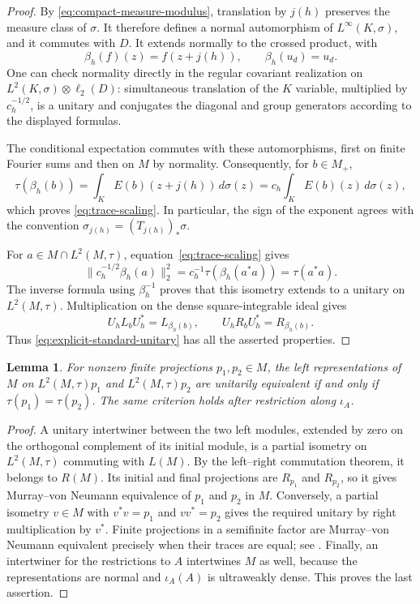 \documentclass[11pt]{article}
\numberwithin{equation}{section}
\newtheorem{lemma}[theorem]{Lemma}
\theoremstyle{definition}
\begin{document}
\begin{proof}
By \eqref{eq:compact-measure-modulus}, translation by $j(h)$ preserves
the measure class of $\sigma$. It therefore defines a normal
automorphism of $L^\infty(K,\sigma)$, and it commutes with $D$.
It extends normally to the crossed product, with
\[
 \beta_h(f)(z)=f(z+j(h)),\qquad \beta_h(u_d)=u_d.
\]
One can check normality directly in the regular covariant realization
on $L^2(K,\sigma)\otimes\ell_2(D)$: simultaneous translation of the
$K$ variable, multiplied by $c_h^{-1/2}$, is a unitary and conjugates
the diagonal and group generators according to the displayed formulas.

The conditional expectation commutes with these automorphisms, first
on finite Fourier sums and then on $M$ by normality. Consequently,
for $b\in M_+$,
\[
 \tau(\beta_h(b))
   =\int_K E(b)(z+j(h))\,d\sigma(z)
   =c_h\int_K E(b)(z)\,d\sigma(z),
\]
which proves \eqref{eq:trace-scaling}. In particular, the sign of the
exponent agrees with the convention $\sigma_{j(h)}=(T_{j(h)})_*\sigma$.

For $a\in M\cap L^2(M,\tau)$, equation~\eqref{eq:trace-scaling} gives
\[
 \|c_h^{-1/2}\beta_h(a)\|_2^2
   =c_h^{-1}\tau(\beta_h(a^*a))=\tau(a^*a).
\]
The inverse formula using $\beta_h^{-1}$ proves that this isometry
extends to a unitary on $L^2(M,\tau)$. Multiplication on the dense
square-integrable ideal gives
\[
 U_hL_bU_h^*=L_{\beta_h(b)},\qquad
 U_hR_bU_h^*=R_{\beta_h(b)}.
\]
Thus \eqref{eq:explicit-standard-unitary} has all the asserted properties.
\end{proof}

\begin{lemma}
\label{lem:right-corner-comparison}
For nonzero finite projections $p_1,p_2\in M$, the left representations
of $M$ on $L^2(M,\tau)p_1$ and $L^2(M,\tau)p_2$ are unitarily equivalent
if and only if $\tau(p_1)=\tau(p_2)$. The same criterion holds after
restriction along $\iota_A$.
\end{lemma}

\begin{proof}
A unitary intertwiner between the two left modules, extended by zero
on the orthogonal complement of its initial module, is a partial
isometry on $L^2(M,\tau)$ commuting with $L(M)$. By the left--right
commutation theorem, it belongs to $R(M)$. Its initial and final
projections are $R_{p_1}$ and $R_{p_2}$, so it gives Murray--von Neumann
equivalence of $p_1$ and $p_2$ in $M$. Conversely, a partial isometry
$v\in M$ with $v^*v=p_1$ and $vv^*=p_2$ gives the required unitary by
right multiplication by $v^*$. Finite projections in a semifinite
factor are Murray--von Neumann equivalent precisely when their traces
are equal; see \cite[Theorem~2.7 and Corollary~2.8(1)]{Sherman}.
Finally, an intertwiner for the restrictions to $A$ intertwines $M$ as
well, because the representations are normal and $\iota_A(A)$ is
ultraweakly dense. This proves the last assertion.
\end{proof}
\end{document}
